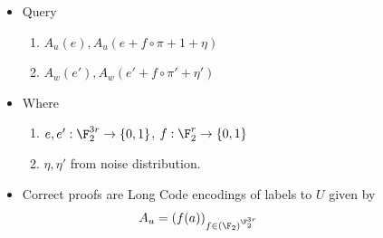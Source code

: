 \documentclass{article}
\begin{document}
\begin{frame}
\begin{columns}[c]



\pause %
\begin{itemize}

\item Query 
\begin{enumerate}
\item $A_u(e),A_u(e+ f\circ \pi + 1+\eta)$
\item $A_w(e'),A_w(e'+f\circ \pi'+ \eta')$
\end{enumerate}
\item Where 
\begin{enumerate}
\item $e,e' :\F_2^{3r} \rightarrow \{0,1\}$,  $f :\F_2^{r} \rightarrow \{0,1\}$
\item $\eta,\eta'$ from noise distribution.
\end{enumerate}
\pause
\item Correct proofs are Long Code encodings of labels to $U$ given by
$$A_u = (f(a))_{f \in  (\F_2)^{\F_2^{3r}}}$$
\end{itemize}\pause
{}
\end{columns}
\end{frame}
\end{document}
